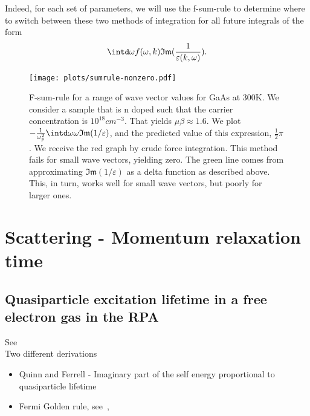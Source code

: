 \documentclass[physics,phd,nolot,nolof]{uccthesis}%
\begin{document}
{Indeed, for each set of parameters, we will use the f-sum-rule to determine where to switch between these two methods of integration for all future integrals
of the form
\begin{equation}
  \intd\omega f(\omega, k) \mathfrak{Im}(\frac{1}{\varepsilon(k,\omega)}).
  \label{eq:iminveps_integrals}
\end{equation}
\begin{figure}[h]
  \begin{center}
    \texttt{[image: plots/sumrule-nonzero.pdf]}
  \end{center}
  \caption{F-sum-rule for a range of wave vector values for GaAs at 300K. We consider a sample that is n doped such that the carrier concentration is $10^{18} cm^{-3}$.
  That yields $\mu\beta \approx 1.6$. 
  We plot $-\frac{1}{\omega_p^2}\intd\omega\omega\mathfrak{Im}(1/\varepsilon)$, and the predicted value of this expression, $\frac{1}{2}\pi$. 
  We receive the red graph by crude force integration. This method fails for small wave vectors, yielding zero.
  The green line comes from approximating $\mathfrak{Im}(1/\varepsilon)$ as a delta function as described above. This, in turn, works well for small wave vectors, but poorly for larger ones. } 
  \label{fig:sumrule-nonzero}
\end{figure}
\newpage
\chapter{Scattering - Momentum relaxation time }
\section{
Quasiparticle excitation lifetime in a free electron gas in the RPA}
See \cite{pineselementary}\\
Two different derivations
\begin{itemize}
  \item Quinn and Ferrell - Imaginary part of the self energy 
    proportional to quasiparticle lifetime\cite{QuinnFerrell}
  \item Fermi Golden rule, see~\cite{pineselementary},\cite{RitchieQuasiparticleLifetimes}
\end{itemize}

}
\end{document}
